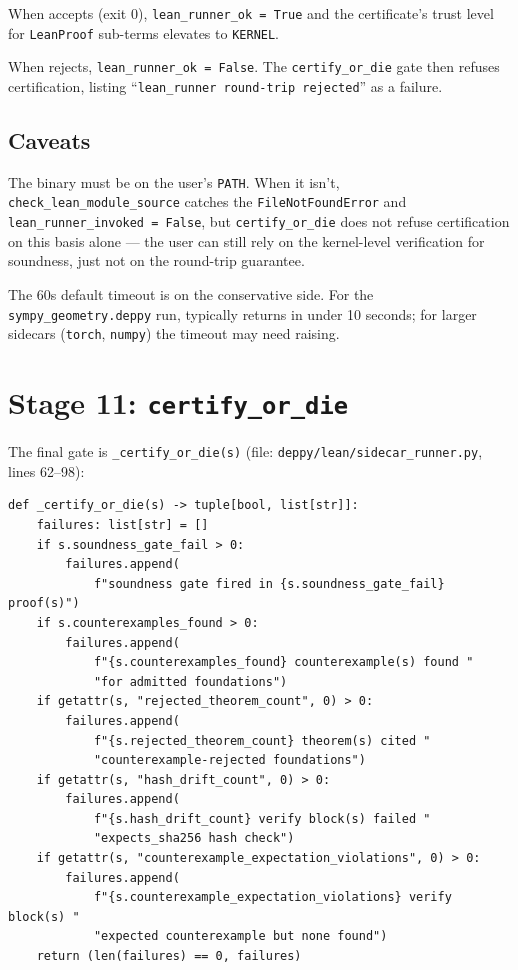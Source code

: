 When \Lean{} accepts (exit 0), \texttt{lean\_runner\_ok = True} and
the certificate's trust level for \texttt{LeanProof} sub-terms
elevates to \texttt{KERNEL}.

When \Lean{} rejects, \texttt{lean\_runner\_ok = False}.  The
\texttt{certify\_or\_die} gate then refuses certification, listing
``\texttt{lean\_runner round-trip rejected}'' as a failure.

\subsection{Caveats}

The \Lean{} binary must be on the user's \texttt{PATH}.  When it
isn't, \texttt{check\_lean\_module\_source} catches the
\texttt{FileNotFoundError} and \texttt{lean\_runner\_invoked =
False}, but \texttt{certify\_or\_die} does not refuse certification
on this basis alone --- the user can still rely on the kernel-level
verification for soundness, just not on the round-trip guarantee.

The 60s default timeout is on the conservative side.  For the
\texttt{sympy\_geometry.deppy} run, \Lean{} typically returns in
under 10 seconds; for larger sidecars (\texttt{torch}, \texttt{numpy})
the timeout may need raising.

\section{Stage 11: \texttt{certify\_or\_die}}
\label{sec:certify-or-die}

The final gate is \texttt{\_certify\_or\_die(s)} (file:
\texttt{deppy/lean/sidecar\_runner.py}, lines 62--98):

\begin{lstlisting}[caption={The \texttt{certify\_or\_die} verdict.}]
def _certify_or_die(s) -> tuple[bool, list[str]]:
    failures: list[str] = []
    if s.soundness_gate_fail > 0:
        failures.append(
            f"soundness gate fired in {s.soundness_gate_fail} proof(s)")
    if s.counterexamples_found > 0:
        failures.append(
            f"{s.counterexamples_found} counterexample(s) found "
            "for admitted foundations")
    if getattr(s, "rejected_theorem_count", 0) > 0:
        failures.append(
            f"{s.rejected_theorem_count} theorem(s) cited "
            "counterexample-rejected foundations")
    if getattr(s, "hash_drift_count", 0) > 0:
        failures.append(
            f"{s.hash_drift_count} verify block(s) failed "
            "expects_sha256 hash check")
    if getattr(s, "counterexample_expectation_violations", 0) > 0:
        failures.append(
            f"{s.counterexample_expectation_violations} verify block(s) "
            "expected counterexample but none found")
    return (len(failures) == 0, failures)
\end{lstlisting}

